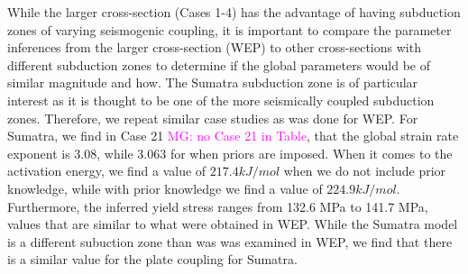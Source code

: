 \documentclass[12pt]{article}
\newcommand{\mgnote}[1]{\textcolor{magenta}{MG: #1}}
\begin{document}
{While the larger cross-section (Cases 1-4) has the advantage of having subduction zones of varying seismogenic coupling, it is important to compare the parameter inferences from the larger cross-section (WEP) to other cross-sections with different subduction zones to determine if the global parameters would be of similar magnitude and how. 
The Sumatra subduction zone is of particular interest as it is thought to be one of the more seismically coupled subduction zones. Therefore, we repeat similar case studies as was done for WEP. For Sumatra, we find in Case 21 \mgnote{no Case 21 in Table}, that the global strain rate exponent is 3.08, while 3.063 for when priors are imposed. When it comes to the activation energy, we find a value of $217.4 kJ/mol$ when we do not include prior knowledge, while 
with prior knowledge we find a value of $224.9 kJ/mol$. Furthermore, the inferred yield stress ranges from 132.6 MPa to 141.7 MPa, values that are similar to what were obtained in WEP. While the Sumatra model is a different subuction zone than was was examined in WEP, we find that there is a similar value for the plate coupling for Sumatra.
\begin{figure}[H]
\centering
\hspace{-0.4cm}
\hspace{-0.1cm}
\hspace{-0.2cm}
\end{figure}}
\end{document}
